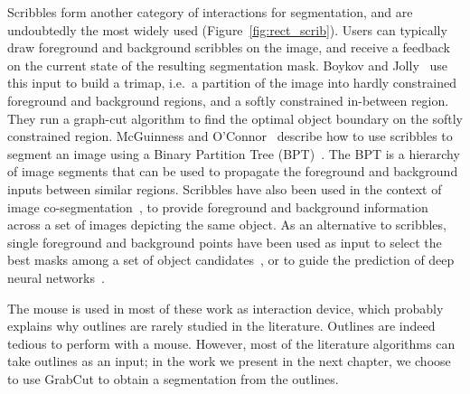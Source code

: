 Scribbles form another category of interactions for segmentation,
and are undoubtedly the most widely used
(Figure~\ref{fig:rect_scrib}).
Users can typically draw foreground and background scribbles
on the image, and receive a feedback on the current state
of the resulting segmentation mask.
Boykov and Jolly~\cite{boykov_interactive_2001} use this input to build a trimap,
i.e.\ a partition of the image into hardly constrained foreground
and background regions, and a softly constrained in-between region.
They run a graph-cut algorithm to find the optimal object boundary
on the softly constrained region.
McGuinness and O'Connor~\cite{mcguinness2010comparative} describe
how to use scribbles to segment an image using
a Binary Partition Tree (BPT)~\cite{salembier2000binary}.
The BPT is a hierarchy of image segments that can be used to propagate
the foreground and background inputs between similar regions.
Scribbles have also been used in the context of
image co-segmentation~\cite{batra_icoseg:_2010},
to provide foreground and background information across
a set of images depicting the same object.
As an alternative to scribbles, single foreground and background points
have been used as input to select the best masks
among a set of object candidates~\cite{carlier_clickncut:_2014}, or to guide
the prediction of deep neural networks~\cite{OpenImagesSegmentation}.


The mouse is used in most of these work as interaction device,
which probably explains why outlines are rarely studied in the literature.
Outlines are indeed tedious to perform with a mouse.
However, most of the literature algorithms can take outlines as an input;
in the work we present in the next chapter, we choose to use GrabCut to obtain
a segmentation from the outlines.

